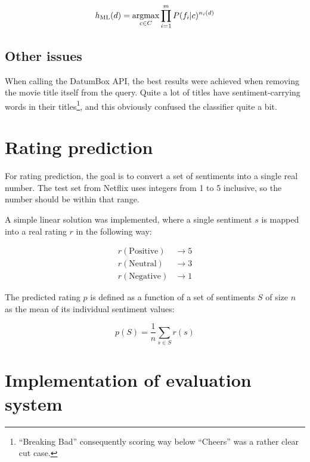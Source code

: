 \begin{equation}
  h_{\text{ML}}(d) = \argmax_{c \in C} \prod_{i=1}^m P(f_i | c)^{n_i(d)}
\end{equation}

\subsection{Other issues}

When calling the DatumBox API, the best results were achieved when removing the movie title itself from the query. Quite a lot of titles have sentiment-carrying words in their titles\footnote{``Breaking Bad'' consequently scoring way below ``Cheers'' was a rather clear cut case.}, and this obviously confused the classifier quite a bit.



\section{Rating prediction} %
\label{sec:rating_prediction}

For rating prediction, the goal is to convert a set of sentiments into a single real number. The test set from Netflix uses integers from 1 to 5 inclusive, so the number should be within that range.

A simple linear solution was implemented, where a single sentiment $s$ is mapped into a real rating $r$ in the following way:

\begin{align*}
  r(\text{Positive}) &\rightarrow 5 \\
  r(\text{Neutral})  &\rightarrow 3 \\
  r(\text{Negative}) &\rightarrow 1
\end{align*}

The predicted rating $p$ is defined as a function of a set of sentiments $S$ of size $n$ as the mean of its individual sentiment values:

\begin{equation}
  p(S) = \frac{1}{n} \sum_{s \in S} r(s)
\end{equation}


\section{Implementation of evaluation system} %
\label{sec:evaluation_impl}

